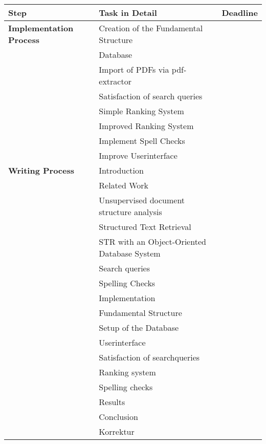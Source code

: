 \documentclass[a4paper, 12pt]{scrartcl}
\begin{document}
\begin{tabular}{ | l | l | c | }
  \hline
  \rowcolor{lightblue}
  \textbf{Step} & \textbf{Task in Detail} & \textbf{Deadline} \\ \hline
  \textbf{Implementation Process} & Creation of the Fundamental Structure & \\ \hline
    & Database & \\ \hline
    & Import of PDFs via pdf-extractor & \\ \hline
    & Satisfaction of search queries & \\ \hline
    & Simple Ranking System & \\ \hline
    & Improved Ranking System & \\ \hline
    & Implement Spell Checks & \\ \hline
    & Improve Userinterface & \\ \hline \hline
  \textbf{Writing Process} & Introduction & \\ \hline
    & Related Work & \\ \hline
    & Unsupervised document structure analysis & \\ \hline
    & Structured Text Retrieval & \\ \hline
    & STR with an Object-Oriented Database System & \\ \hline
    & Search queries & \\ \hline
    & Spelling Checks & \\ \hline
    & Implementation & \\ \hline
    & Fundamental Structure & \\ \hline
    & Setup of the Database & \\ \hline
    & Userinterface & \\ \hline
    & Satisfaction of searchqueries & \\ \hline
    & Ranking system & \\ \hline
    & Spelling checks & \\ \hline
    & Results & \\ \hline
    & Conclusion & \\ \hline
    & Korrektur & \\ \hline
\end{tabular}
\end{document}
